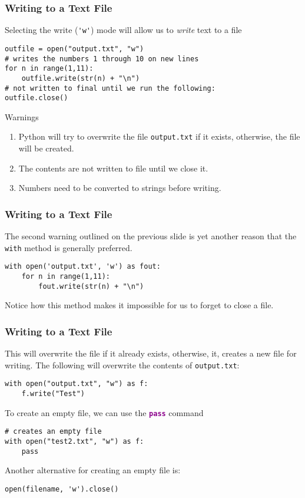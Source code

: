 \documentclass[xcolor=svgnames]{beamer}
\newcommand{\command}[1]{\texttt{\textbf{\textcolor{DarkMagenta}{#1}}}}
\newcommand{\ft}[1]{\frametitle{#1}}
\begin{document}
\begin{frame}[fragile]\ft{Writing to a Text File}
\vfill
Selecting the write (\verb|'w'|) mode will allow us to \emph{write} text to a file
\vfill
\begin{Verbatim}[frame=single]
outfile = open("output.txt", "w")
# writes the numbers 1 through 10 on new lines
for n in range(1,11):
    outfile.write(str(n) + "\n")
# not written to final until we run the following:
outfile.close() 
\end{Verbatim}
\vfill
\begin{alertblock}{Warnings}
\begin{enumerate}
\item Python will try to overwrite the file {\tt output.txt} if it exists, otherwise, the file will be created.
\item The contents are not written to file until we close it. 
\item Numbers need to be converted to strings before writing.
\end{enumerate}
\end{alertblock}
\vfill
\end{frame}

\begin{frame}[fragile]\ft{Writing to a Text File}
The second warning outlined on the previous slide is yet another reason that the {\tt with} method is generally preferred. %
\begin{Verbatim}[xleftmargin=.5in, frame=single]
with open('output.txt', 'w') as fout:
    for n in range(1,11):
        fout.write(str(n) + "\n")
\end{Verbatim}
Notice how this method makes it impossible for us to forget to close a file.
\end{frame}



\begin{frame}[fragile]\ft{Writing to a Text File}
 This will overwrite the file if it already exists, otherwise, it, creates a new file for writing.  The following will overwrite the contents of {\tt output.txt}:
\begin{Verbatim}[xleftmargin=.5in, frame=single]
with open("output.txt", "w") as f:
    f.write("Test")
\end{Verbatim}
\vfill
To create an empty file, we can use the \command{pass} command 
\vfill
\begin{Verbatim}[xleftmargin=.5in, frame=single]
# creates an empty file
with open("test2.txt", "w") as f:
    pass
\end{Verbatim}
Another alternative for creating an empty file is:
\vfill
\begin{Verbatim}[xleftmargin=.5in, frame=single]
open(filename, 'w').close()
\end{Verbatim}
\vfill
\end{frame}
\end{document}
